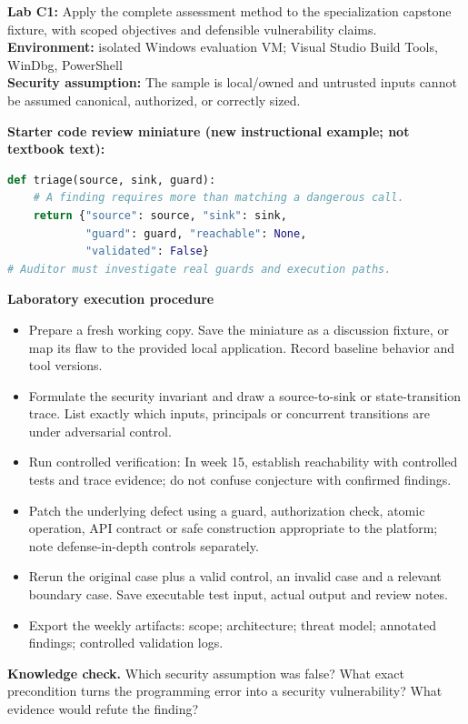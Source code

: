 \documentclass[10pt,letterpaper]{article}
\begin{document}
\begin{insight}\textbf{Lab C1:} Apply the complete assessment method to the specialization capstone fixture, with scoped objectives and defensible vulnerability claims.\\\textbf{Environment:} isolated Windows evaluation VM; Visual Studio Build Tools, WinDbg, PowerShell\\\textbf{Security assumption:} The sample is local/owned and untrusted inputs cannot be assumed canonical, authorized, or correctly sized.\end{insight}
\textbf{Starter code review miniature (new instructional example; not textbook text):}
\begin{lstlisting}[language=Python]
def triage(source, sink, guard):
    # A finding requires more than matching a dangerous call.
    return {"source": source, "sink": sink,
            "guard": guard, "reachable": None,
            "validated": False}
# Auditor must investigate real guards and execution paths.
\end{lstlisting}
\textbf{Laboratory execution procedure}
\begin{itemize}[leftmargin=*,itemsep=2pt]
\item Prepare a fresh working copy. Save the miniature as a discussion fixture, or map its flaw to the provided local application. Record baseline behavior and tool versions.
\item Formulate the security invariant and draw a source-to-sink or state-transition trace. List exactly which inputs, principals or concurrent transitions are under adversarial control.
\item Run controlled verification: In week 15, establish reachability with controlled tests and trace evidence; do not confuse conjecture with confirmed findings.
\item Patch the underlying defect using a guard, authorization check, atomic operation, API contract or safe construction appropriate to the platform; note defense-in-depth controls separately.
\item Rerun the original case plus a valid control, an invalid case and a relevant boundary case. Save executable test input, actual output and review notes.
\item Export the weekly artifacts: scope; architecture; threat model; annotated findings; controlled validation logs.
\end{itemize}
\textbf{Knowledge check.} Which security assumption was false? What exact precondition turns the programming error into a security vulnerability? What evidence would refute the finding?
\end{document}
